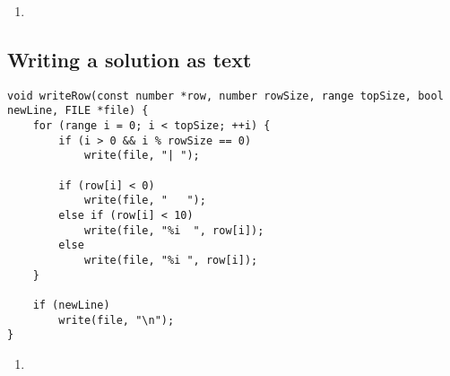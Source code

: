 \begin{enumerate}
\addtocounter{enumi}{1}
\item 
\end{enumerate}

\subsection{Writing a solution as text}

\begin{lstlisting}[caption={},label={writeRow}]
void writeRow(const number *row, number rowSize, range topSize, bool newLine, FILE *file) {
    for (range i = 0; i < topSize; ++i) {
        if (i > 0 && i % rowSize == 0)
            write(file, "| ");

        if (row[i] < 0)
            write(file, "   ");
        else if (row[i] < 10)
            write(file, "%i  ", row[i]);
        else
            write(file, "%i ", row[i]);
    }

    if (newLine)
        write(file, "\n");
}
\end{lstlisting}

\begin{enumerate}
\addtocounter{enumi}{1}
\item 
\end{enumerate}

